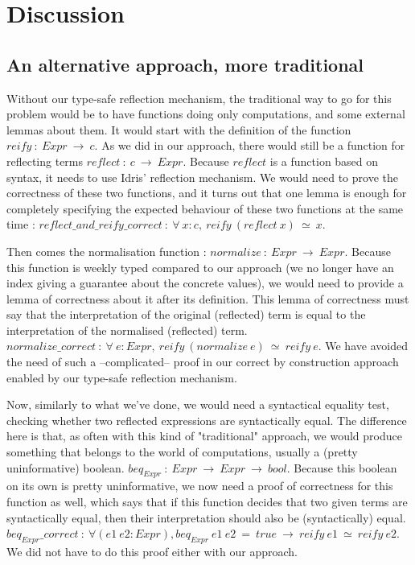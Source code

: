 \section {Discussion}

\label{sect:discuss}

	\subsection{An alternative approach, more traditional}

Without our type-safe reflection mechanism, the traditional way to go for this problem would be to have functions doing only computations, and some external lemmas about them. It would start with the definition of the function $reify\ :\ Expr\ \rightarrow\ c$. As we did in our approach, there would still be a function for reflecting terms $reflect\ :\ c\ \rightarrow\ Expr$. Because $reflect$ is a function based on syntax, it needs to use Idris' reflection mechanism. We would need to prove the correctness of these two functions, and it turns out that one lemma is enough for completely specifying the expected behaviour of these two functions at the same time : $reflect\_and\_reify\_correct\ :\ \forall\ x:c,\ reify\ (reflect\ x)\  \simeq \ x$.

Then comes the normalisation function : $normalize\ :\ Expr\ \rightarrow\ Expr$. Because this function is weekly typed compared to our approach (we no longer have an index giving a guarantee about the concrete values), we would need to provide a lemma of correctness about it after its definition. This lemma of correctness must say that the interpretation of the original (reflected) term is equal to the interpretation of the normalised (reflected) term. $normalize\_correct\ :\ \forall\ e:Expr,\ reify\ (normalize\ e)\  \simeq\ reify\ e$. We have avoided the need of such a --complicated-- proof in our correct by construction approach enabled by our type-safe reflection mechanism.

Now, similarly to what we've done, we would need a syntactical equality test, checking whether two reflected expressions are syntactically equal. The difference here is that, as often with this kind of "traditional" approach, we would produce something that belongs to the world of computations, usually a (pretty uninformative) boolean.
$beq_{Expr}\ :\ Expr\ \rightarrow\ Expr\ \rightarrow\ bool$. Because this boolean on its own is pretty uninformative, we now need a proof of correctness for this function as well, which says that if this function decides that two given terms are syntactically equal, then their interpretation should also be (syntactically) equal. $beq_{Expr}\_correct\ :\ \forall (e1\ e2:Expr), beq_{Expr}\ e1\ e2\ =\ true\ \rightarrow\ reify\ e1\  \simeq\ reify\ e2$. We did not have to do this proof either with our approach.

